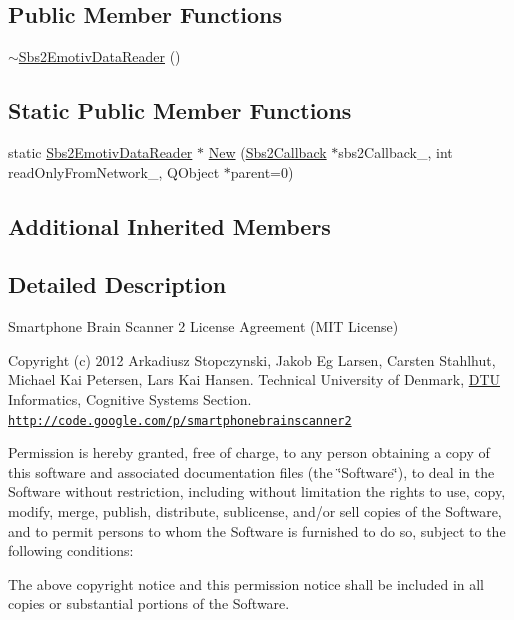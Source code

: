 \subsection*{Public Member Functions}
\begin{DoxyCompactItemize}
\item 
\hyperlink{classSbs2EmotivDataReader_af2d1b49542ec2cd354c846e7483aa531}{$\sim$\-Sbs2\-Emotiv\-Data\-Reader} ()
\end{DoxyCompactItemize}
\subsection*{Static Public Member Functions}
\begin{DoxyCompactItemize}
\item 
static \hyperlink{classSbs2EmotivDataReader}{Sbs2\-Emotiv\-Data\-Reader} $\ast$ \hyperlink{classSbs2EmotivDataReader_a5b2be10b38b907f41716830f706991c8}{New} (\hyperlink{classSbs2Callback}{Sbs2\-Callback} $\ast$sbs2\-Callback\-\_\-, int read\-Only\-From\-Network\-\_, Q\-Object $\ast$parent=0)
\end{DoxyCompactItemize}
\subsection*{Additional Inherited Members}


\subsection{Detailed Description}
Smartphone Brain Scanner 2 License Agreement (M\-I\-T License)

Copyright (c) 2012 Arkadiusz Stopczynski, Jakob Eg Larsen, Carsten Stahlhut, Michael Kai Petersen, Lars Kai Hansen. Technical University of Denmark, \hyperlink{namespaceDTU}{D\-T\-U} Informatics, Cognitive Systems Section. \href{http://code.google.com/p/smartphonebrainscanner2}{\tt http\-://code.\-google.\-com/p/smartphonebrainscanner2}

Permission is hereby granted, free of charge, to any person obtaining a copy of this software and associated documentation files (the \char`\"{}\-Software\char`\"{}), to deal in the Software without restriction, including without limitation the rights to use, copy, modify, merge, publish, distribute, sublicense, and/or sell copies of the Software, and to permit persons to whom the Software is furnished to do so, subject to the following conditions\-:

The above copyright notice and this permission notice shall be included in all copies or substantial portions of the Software.

